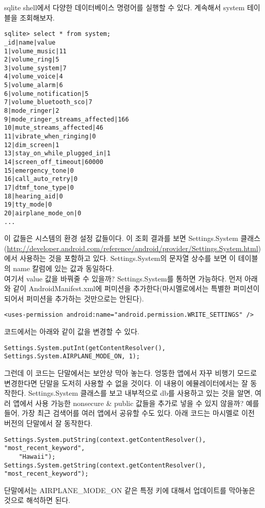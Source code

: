 sqlite shell에서 다양한 데이터베이스 명령어를 실행할 수 있다. 계속해서 system 테이블을 조회해보자.
\begin{lstlisting}[frame=single] 
sqlite> select * from system;
_id|name|value
1|volume_music|11
2|volume_ring|5
3|volume_system|7
4|volume_voice|4
5|volume_alarm|6
6|volume_notification|5
7|volume_bluetooth_sco|7
8|mode_ringer|2
9|mode_ringer_streams_affected|166
10|mute_streams_affected|46
11|vibrate_when_ringing|0
12|dim_screen|1
13|stay_on_while_plugged_in|1
14|screen_off_timeout|60000
15|emergency_tone|0
16|call_auto_retry|0
17|dtmf_tone_type|0
18|hearing_aid|0
19|tty_mode|0
20|airplane_mode_on|0
...
\end{lstlisting}
이 값들은 시스템의 환경 설정 값들이다. 이 조회 결과를 보면 Settings.System 클래스(\url{http://developer.android.com/reference/android/provider/Settings.System.html})에서 사용하는 것을 포함하고 있다. 
Settings.System의 문자열 상수를 보면 이 테이블의 name 칼럼에 있는 값과 동일하다.\\

여기서 value 값을 바꿔줄 수 있을까? Settings.System를 통하면 가능하다.
먼저 아래와 같이 AndroidManifest.xml에 퍼미션을 추가한다(마시멜로에서는 특별한 퍼미션이 되어서 퍼미션을 추가하는 것만으로는 안된다).
\begin{lstlisting}[frame=single]
<uses-permission android:name="android.permission.WRITE_SETTINGS" />
\end{lstlisting}

코드에서는 아래와 같이 값을 변경할 수 있다.
\begin{lstlisting}[frame=single]
Settings.System.putInt(getContentResolver(), Settings.System.AIRPLANE_MODE_ON, 1);
\end{lstlisting}

그런데 이 코드는 단말에서는 보안상 막아 놓는다. 엉뚱한 앱에서 자꾸 비행기 모드로 변경한다면 단말을 도저히 사용할 수 없을 것이다.
이 내용이 에뮬레이터에서는 잘 동작한다.
Settings.System 클래스를 보고 내부적으로 db를 사용하고 있는 것을 알면, 여러 앱에서 사용 가능한 nonsecure \& public 값들을 추가로 넣을 수 있지 않을까? 
예를 들어, 가장 최근 검색어를 여러 앱에서 공유할 수도 있다.
아래 코드는 마시멜로 이전 버전의 단말에서 잘 동작한다.
\begin{lstlisting}[frame=single]
Settings.System.putString(context.getContentResolver(), "most_recent_keyword",
	"Hawaii");
Settings.System.getString(context.getContentResolver(), "most_recent_keyword");
\end{lstlisting}

단말에서는 AIRPLANE\_MODE\_ON 같은 특정 키에 대해서 업데이트를 막아놓은 것으로 해석하면 된다.\\

